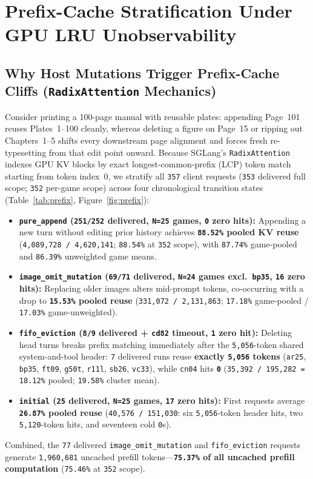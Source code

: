 \documentclass[10pt]{article}
\newcommand{\code}[1]{\texttt{#1}}
\begin{document}
\section{Prefix-Cache Stratification Under GPU LRU Unobservability}
\label{sec:cache}

\subsection{Why Host Mutations Trigger Prefix-Cache Cliffs (\code{RadixAttention} Mechanics)}
Consider printing a 100-page manual with reusable plates: appending Page~101 reuses Plates~1--100 cleanly, whereas deleting a figure on Page~15 or ripping out Chapters~1--5 shifts every downstream page alignment and forces fresh re-typesetting from that edit point onward. Because SGLang's \code{RadixAttention} \citep{zheng2024sglang} indexes GPU KV blocks by exact longest-common-prefix (LCP) token match starting from token index~0, we stratify all \code{357} client requests (\code{353} delivered full scope; \code{352} per-game scope) across four chronological transition states (Table~\ref{tab:prefix}, Figure~\ref{fig:prefix}):
\begin{itemize}[leftmargin=1.4em,itemsep=2pt]
\item \textbf{\code{pure\_append} (\code{251/252} delivered, \code{N=25} games, \code{0} zero hits):} Appending a new turn without editing prior history achieves \textbf{\code{88.52\%} pooled KV reuse} (\code{4,089,728 / 4,620,141}; \code{88.54\%} at \code{352} scope), with \code{87.74\%} game-pooled and \code{86.39\%} unweighted game means.
\item \textbf{\code{image\_omit\_mutation} (\code{69/71} delivered, \code{N=24} games excl.\ \code{bp35}, \code{16} zero hits):} Replacing older images alters mid-prompt tokens, co-occurring with a drop to \textbf{\code{15.53\%} pooled reuse} (\code{331,072 / 2,131,863}; \code{17.18\%} game-pooled / \code{17.03\%} game-unweighted).
\item \textbf{\code{fifo\_eviction} (\code{8/9} delivered + \code{cd82} timeout, \code{1} zero hit):} Deleting head turns breaks prefix matching immediately after the \code{5,056}-token shared system-and-tool header: \code{7} delivered runs reuse \textbf{exactly \code{5,056} tokens} (\code{ar25}, \code{bp35}, \code{ft09}, \code{g50t}, \code{r11l}, \code{sb26}, \code{vc33}), while \code{cn04} hits \textbf{\code{0}} (\code{35,392 / 195,282 = 18.12\%} pooled; \code{19.58\%} cluster mean).
\item \textbf{\code{initial} (\code{25} delivered, \code{N=25} games, \code{17} zero hits):} First requests average \textbf{\code{26.87\%} pooled reuse} (\code{40,576 / 151,030}: six \code{5,056}-token header hits, two \code{5,120}-token hits, and seventeen cold \code{0}s).
\end{itemize}
Combined, the \code{77} delivered \code{image\_omit\_mutation} and \code{fifo\_eviction} requests generate \code{1,960,681} uncached prefill tokens---\textbf{\code{75.37\%} of all uncached prefill computation} (\code{75.46\%} at \code{352} scope).
\end{document}
